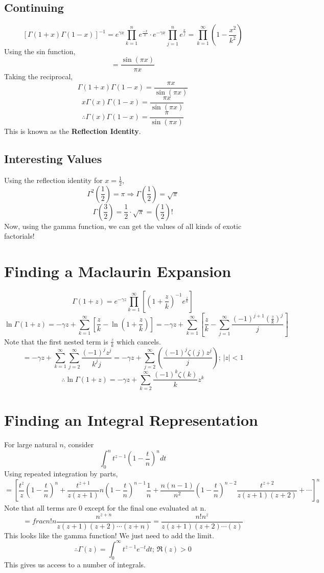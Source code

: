 \documentclass[../main.tex]{subfiles}
\begin{document}
    \subsection{Continuing}
        $$\left[\Gamma(1+x)\Gamma(1-x)\right]^{-1}=e^{\gamma x}\prod_{k=1}^{n}e^{\frac{-x}{k}}\cdot e^{-\gamma x}\prod_{j=1}^{n}e^{\frac{x}{j}}=\prod_{k=1}^{\infty}\left(1-\frac{x^{2}}{k^{2}}\right)$$
        Using the sin function,
        $$=\frac{\sin(\pi x)}{\pi x}$$
        Taking the reciprocal,
        $$\Gamma(1+x)\Gamma(1-x)=\frac{\pi x}{\sin(\pi x)}$$
        $$x\Gamma(x)\Gamma(1-x)=\frac{\pi x}{\sin(\pi x)}$$
        $$\boxed{\therefore \Gamma(x)\Gamma(1-x)=\frac{\pi}{\sin(\pi x)}}$$
        This is known as the \textbf{Reflection Identity}.

    \subsection{Interesting Values}
        Using the reflection identity for $x=\frac{1}{2}$,
        $$\Gamma^{2}(\frac{1}{2})=\pi\Rightarrow\Gamma(\frac{1}{2})=\sqrt{\pi}$$
        $$\Gamma(\frac{3}{2})=\frac{1}{2}\cdot \sqrt{\pi}=(\frac{1}{2})!$$
        Now, using the gamma function, we can get the values of all kinds of exotic factorials!

\section{Finding a Maclaurin Expansion}
    $$\Gamma(1+z)=e^{-\gamma z}\prod_{k=1}^{\infty}\left[(1+\frac{z}{k})^{-1}e^{\frac{z}{k}}\right]$$
    $$\ln\Gamma(1+z)=-\gamma z + \sum_{k=1}^{\infty}\left[\frac{z}{k}-\ln(1+\frac{z}{k})\right]=-\gamma z + \sum_{k=1}^{\infty}\left[\frac{z}{k}-\sum_{j=1}^{\infty}\frac{(-1)^{j+1}(\frac{z}{k})^{j}}{j}\right]$$
    Note that the first nested term is $\frac{z}{k}$ which cancels.
    $$=-\gamma z +\sum_{k=1}^{\infty}\sum_{j=2}^{\infty}\frac{(-1)^{j}z^{j}}{k^{j}j}=-\gamma z +\sum_{j=2}^{\infty}\left(\frac{(-1)^{j}\zeta(j)z^{j}}{j}\right)\text{; }|z|<1$$
    $$\boxed{\therefore \ln\Gamma(1+z)=-\gamma z +\sum_{k=2}^{\infty}\frac{(-1)^{k}\zeta(k)}{k}z^{k}}$$

\section{Finding an Integral Representation}
    For large natural $n$, consider
    $$\int_{0}^{n}t^{z-1}(1-\frac{t}{n})^{n}dt$$
    Using repeated integration by parts,
    $$=\left[\frac{t^{z}}{z}(1-\frac{t}{n})^{n}+\frac{t^{z+1}}{z(z+1)}n(1-\frac{t}{n})^{n-1}\frac{1}{n}+\frac{n(n-1)}{n^{2}}(1-\frac{t}{n})^{n-2}\frac{t^{z+2}}{z(z+1)(z+2)}+\cdots\right]_{0}^{n}$$
    Note that all terms are 0 except for the final one evaluated at n.
    $$=frac{n!}{n}\frac{n^{z+n}}{z(z+1)(z+2)\cdots (z+n)}=\frac{n! n^{z}}{z(z+1)(z+2)\cdots (z)}$$
    This looks like the gamma function! We just need to add the limit.
    $$\boxed{\therefore\Gamma(z)=\int_{0}^{\infty}t^{z-1}e^{-t}dt\text{; }\Re(z)>0}$$
    This gives us access to a number of integrals.
\end{document}
